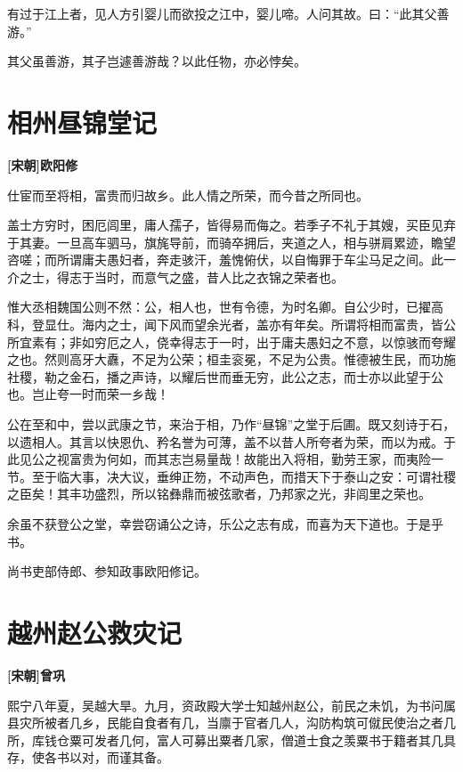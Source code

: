 \documentclass[UTF8,titlepage,oneside]{ctexbook}
\begin{document}
有过于江上者，见人方引婴儿而欲投之江中，婴儿啼。人问其故。曰：“此其父善游。”


其父虽善游，其子岂遽善游哉？以此任物，亦必悖矣。



\chapter*{相州昼锦堂记}
\begin{center}
	\textbf{[宋朝]欧阳修}
\end{center}


仕宦而至将相，富贵而归故乡。此人情之所荣，而今昔之所同也。


盖士方穷时，困厄闾里，庸人孺子，皆得易而侮之。若季子不礼于其嫂，买臣见弃于其妻。一旦高车驷马，旗旄导前，而骑卒拥后，夹道之人，相与骈肩累迹，瞻望咨嗟；而所谓庸夫愚妇者，奔走骇汗，羞愧俯伏，以自悔罪于车尘马足之间。此一介之士，得志于当时，而意气之盛，昔人比之衣锦之荣者也。


惟大丞相魏国公则不然：公，相人也，世有令德，为时名卿。自公少时，已擢高科，登显仕。海内之士，闻下风而望余光者，盖亦有年矣。所谓将相而富贵，皆公所宜素有；非如穷厄之人，侥幸得志于一时，出于庸夫愚妇之不意，以惊骇而夸耀之也。然则高牙大纛，不足为公荣；桓圭衮冕，不足为公贵。惟德被生民，而功施社稷，勒之金石，播之声诗，以耀后世而垂无穷，此公之志，而士亦以此望于公也。岂止夸一时而荣一乡哉！


公在至和中，尝以武康之节，来治于相，乃作“昼锦”之堂于后圃。既又刻诗于石，以遗相人。其言以快恩仇、矜名誉为可薄，盖不以昔人所夸者为荣，而以为戒。于此见公之视富贵为何如，而其志岂易量哉！故能出入将相，勤劳王家，而夷险一节。至于临大事，决大议，垂绅正笏，不动声色，而措天下于泰山之安：可谓社稷之臣矣！其丰功盛烈，所以铭彝鼎而被弦歌者，乃邦家之光，非闾里之荣也。


余虽不获登公之堂，幸尝窃诵公之诗，乐公之志有成，而喜为天下道也。于是乎书。


尚书吏部侍郎、参知政事欧阳修记。



\chapter*{越州赵公救灾记}
\begin{center}
	\textbf{[宋朝]曾巩}
\end{center}


熙宁八年夏，吴越大旱。九月，资政殿大学士知越州赵公，前民之未饥，为书问属县灾所被者几乡，民能自食者有几，当廪于官者几人，沟防构筑可僦民使治之者几所，库钱仓粟可发者几何，富人可募出粟者几家，僧道士食之羡粟书于籍者其几具存，使各书以对，而谨其备。
\end{document}
